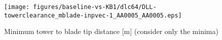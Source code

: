 \begin{figure}[!ht]
\begin{center}
	\texttt{[image: figures/baseline-vs-KB1/dlc64/DLL-towerclearance\_mblade-inpvec-1\_AA0005\_AA0005.eps]}
\end{center}
\caption{Minimum tower to blade tip distance [m] (consider only the minima)}
\label{fig:baseline-vs-KB1:dlc64:tower-tip-clearance}
\end{figure}

